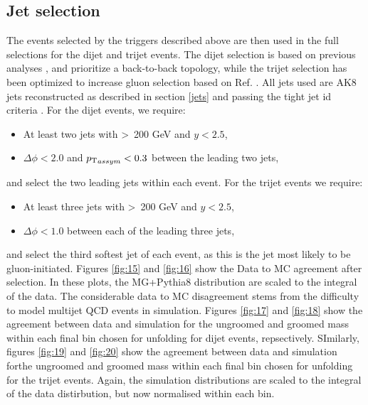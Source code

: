 \subsection{Jet selection}\label{selection}
The events selected by the triggers described above are then used in the full selections for the dijet and trijet events. The dijet selection is based on previous analyses \cite{1605_IncJet}, \cite{dijetZjet2013} and prioritize a back-to-back topology, while the trijet selection  has been optimized to increase gluon selection based on Ref. \cite{pureSamples}. All jets used are AK8 jets reconstructed as described in section \ref{jets} and passing the tight jet id criteria \cite{jetid}. %
For the dijet events, we require:
\begin{itemize}
	\item At least two jets with \pt\textgreater\, 200 GeV and $y < 2.5$,
	\item $\Delta\phi < 2.0$ and ${p_{\mathrm{T}}}_{assym}<0.3$ between the leading two jets,
\end{itemize}
and select the two leading jets within each event.
For the trijet events we require:
\begin{itemize}
	\item At least three jets with \pt\textgreater\, 200 GeV and $y < 2.5$,
	\item $\Delta\phi < 1.0$ between each of the leading three jets,
\end{itemize}
and select the third softest jet of each event, as this is the jet most likely to be gluon-initiated.
Figures \ref{fig:15} and \ref{fig:16} show the Data to MC agreement after selection. In these plots, the MG+Pythia8 distribution are scaled to the integral of the data. The considerable data to MC disagreement stems from the difficulty to model multijet QCD events in simulation. Figures \ref{fig:17} and \ref{fig:18} show the agreement between data and simulation for the ungroomed and groomed mass within each final \pt bin chosen for unfolding for dijet events, repsectively.  SImilarly, figures \ref{fig:19} and \ref{fig:20} show the agreement between data and simulation forthe ungroomed and groomed mass within each final \pt bin chosen for unfolding for the trijet events. Again, the simulation distributions are scaled to the integral of the data distirbution, but now normalised within each \pt bin.
